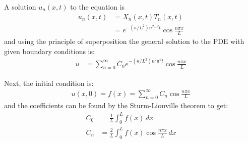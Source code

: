 A solution $u_n(x,t)$ to the equation is 
%
\begin{align*}
u_n(x,t) & = X_n(x,t) T_n(x,t) \\
& = e^{-(\kappa/L^2) n^2 \pi^2 t} \cos \frac{n \pi x}{L} 
\end{align*}
and using the principle of superposition the general solution to the PDE with given boundary conditions is:
%
\begin{align*}
u & = \sum_{n=0}^{\infty} C_n e^{-(\kappa/L^2) n^2 \pi^2 t} \cos \frac{n \pi x}{L} 
\end{align*}

Next, the initial condition is:
% 
\begin{align*}
u(x,0) = f(x) = \sum_{n=0}^{\infty} C_n \cos \frac{n \pi x}{L} 
\end{align*}
and the coefficients can be found by the Sturm-Liouville theorem to get:
% 
\begin{align*}
C_0 & = \frac{1}{L} \int_0^L f(x) \, dx \\
C_n & = \frac{2}{L} \int_0^L f(x) \cos \frac{ n \pi x}{L} \, dx 
\end{align*}


